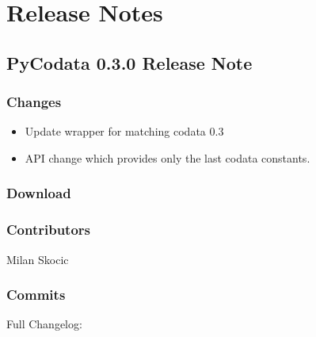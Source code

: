 \documentclass[a4paper,10pt,english]{sphinxmanual}
\begin{document}
\sphinxstepscope


\chapter{Release Notes}
\label{\detokenize{releases/index:release-notes}}\label{\detokenize{releases/index::doc}}
\sphinxstepscope


\section{PyCodata 0.3.0 Release Note}
\label{\detokenize{releases/0.3.0-notes:pycodata-0-3-0-release-note}}\label{\detokenize{releases/0.3.0-notes::doc}}

\subsection{Changes}
\label{\detokenize{releases/0.3.0-notes:changes}}\begin{itemize}
\item {} 
\sphinxAtStartPar
Update wrapper for matching codata 0.3

\item {} 
\sphinxAtStartPar
API change which provides only the last codata constants.

\end{itemize}


\subsection{Download}
\label{\detokenize{releases/0.3.0-notes:download}}
\sphinxAtStartPar
{}


\subsection{Contributors}
\label{\detokenize{releases/0.3.0-notes:contributors}}
\sphinxAtStartPar
Milan Skocic


\subsection{Commits}
\label{\detokenize{releases/0.3.0-notes:commits}}
\sphinxAtStartPar
Full Changelog: 

\sphinxstepscope
\end{document}
